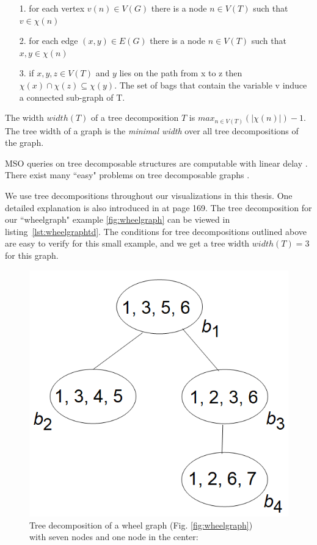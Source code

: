 \documentclass[a4paper, 12pt, bibliography=totoc]{scrartcl}
\begin{document}
\begin{itemize}
	\item[1.] for each vertex $v(n) \in V(G)$ there is a node $n \in V(T)$ such that $v \in \chi(n)$
	\item[2.] for each edge $(x,y) \in E(G)$ there is a node $n\in V(T)$ such that $x,y \in\chi(n)$
	\item[3.] if $x,y,z \in V(T)$ and $y$ lies on the path from x to z then $\chi(x) \cap \chi(z) \subseteq \chi(y)$. The set of bags that contain the variable v induce a connected sub-graph of T.
\end{itemize}
The width $width(T)$ of a tree decomposition $T$ is $max_{n\in V(T)}(|\chi(n)|)-1$.
The tree width of a graph is the \textit{minimal width} over all tree decompositions of the graph. 


MSO queries on tree decomposable structures are computable with linear delay \cite{MSOQueriesGuillaume}. There exist many ``easy" problems on tree decomposable graphs \cite{ARNBORG1991308}.

We use tree decompositions throughout our visualizations in this thesis. One detailed explanation is also introduced in \cite{pcgp2019} at page 169.
The tree decomposition for our ``wheelgraph" example \ref{fig:wheelgraph} can be viewed in listing~\ref{lst:wheelgraphtd}. The conditions for tree decompositions outlined above are easy to verify for this small example, and we get a tree width $width(T)=3$ for this graph.

\begin{figure}
	\centering
	\caption{Tree decomposition of a wheel graph (Fig. \ref{fig:wheelgraph}) \\
		with seven nodes and one node in the center:}
	\label{fig:tdweelgraph7}
	\includegraphics[]{images/TDWheelgraph7.png}
	
\end{figure}
\end{document}
